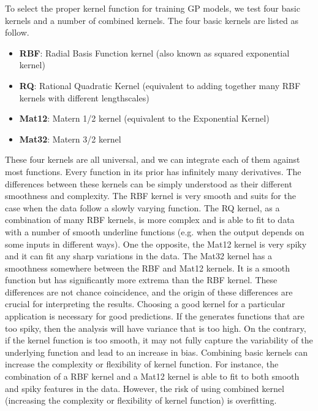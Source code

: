 To select the proper kernel function for training GP models, we test four basic kernels and a number of combined kernels. 
%
The four basic kernels are listed as follow. 
\begin{itemize}
\item {\bf RBF}: Radial Basis Function kernel (also known as squared exponential kernel)
\item {\bf RQ}: Rational Quadratic Kernel (equivalent to adding together many RBF kernels with different lengthscales)
\item {\bf Mat12}: Matern 1/2 kernel (equivalent to the Exponential Kernel)
\item {\bf Mat32}: Matern 3/2 kernel 
\end{itemize}
These four kernels are all universal, and we can integrate each of them against most functions. Every function in its prior has infinitely many derivatives. The differences between these kernels can be simply understood as their different smoothness and complexity. The RBF kernel is very smooth and suits for the case when the data follow a slowly varying function. The RQ kernel, as a combination of many RBF kernels, is more complex and is able to fit to data with a number of smooth underline functions (e.g. when the output depends on some inputs in different ways). One the opposite, the Mat12 kernel is very spiky and it can fit any sharp variations in the data. The Mat32 kernel has a smoothness somewhere between the RBF and Mat12 kernels. It is a smooth function but has significantly more extrema than the RBF kernel. 
%
These differences are not chance coincidence, and the origin of these differences are crucial for interpreting the results. Choosing a good kernel for a particular application is necessary for good predictions. If the generates functions that are too spiky, then the analysis will have variance that is too high. On the contrary, if the kernel function is too smooth, it may not fully capture the variability of the underlying function and lead to an increase in bias.
%
Combining basic kernels can increase the complexity or flexibility of kernel function. For instance, the combination of a RBF kernel and a Mat12 kernel is able to fit to both smooth and spiky features in the data. However, the risk of using combined kernel (increasing the complexity or flexibility of kernel function) is overfitting. 

